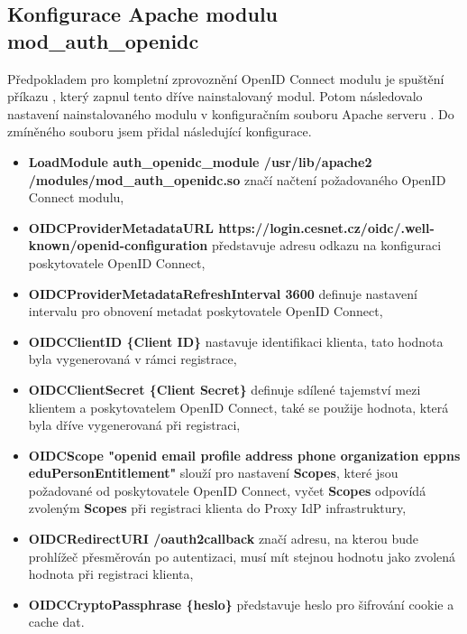 \documentclass[
  printed, %
  twoside, %
  table,   %
  nolof,     %
  nolot,     %
]{fithesis3}
\begin{document}
\subsection{Konfigurace Apache modulu mod\_auth\_openidc} 
\label{sec:mod-conf}
Předpokladem pro kompletní zprovoznění OpenID Connect modulu je spuštění příkazu , který zapnul tento dříve nainstalovaný modul. Potom následovalo nastavení nainstalovaného modulu v konfiguračním souboru Apache serveru . Do zmíněného souboru jsem přidal následující konfigurace.

\begin{itemize}
    \item \textbf{LoadModule auth\_openidc\_module /usr/lib/apache2\\ /modules/mod\_auth\_openidc.so} značí načtení požadovaného OpenID Connect modulu, 
    \item \textbf{OIDCProviderMetadataURL https://login.cesnet.cz/oidc/.well-known/openid-configuration} představuje adresu odkazu na konfiguraci poskytovatele OpenID Connect, 
    \item \textbf{OIDCProviderMetadataRefreshInterval 3600} definuje nastavení intervalu pro obnovení metadat poskytovatele OpenID Connect, 
    \item \textbf{OIDCClientID \{Client ID\}} nastavuje identifikaci klienta, tato hodnota byla vygenerovaná v rámci registrace,
    \item \textbf{OIDCClientSecret \{Client Secret\}} definuje sdílené tajemství mezi klientem a poskytovatelem OpenID Connect, také se použije hodnota, která byla dříve vygenerovaná při registraci,
    \item \textbf{OIDCScope "openid email profile address phone organization eppns eduPersonEntitlement"} slouží pro nastavení \textbf{Scopes}, které jsou požadované od poskytovatele OpenID Connect, vyčet \textbf{Scopes} odpovídá zvoleným \textbf{Scopes} při registraci klienta do Proxy IdP infrastruktury,
    \item \textbf{OIDCRedirectURI /oauth2callback} značí adresu, na kterou bude prohlížeč přesměrován po autentizaci, musí mít stejnou hodnotu jako zvolená hodnota při registraci klienta, 
    \item \textbf{OIDCCryptoPassphrase \{heslo\}} představuje heslo pro šifrování cookie a cache dat. 
\end{itemize}
\end{document}
